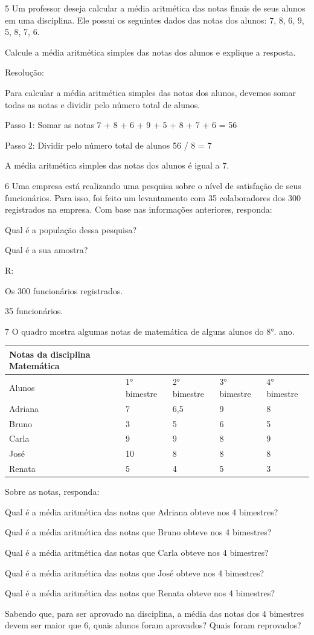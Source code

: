 {\num{5} Um professor deseja calcular a média aritmética das notas finais de
seus alunos em uma disciplina. Ele possui os seguintes dados das notas
dos alunos: 7, 8, 6, 9, 5, 8, 7, 6.

Calcule a média aritmética simples das notas dos alunos e explique a
resposta.

Resolução:

Para calcular a média aritmética simples das notas dos alunos, devemos
somar todas as notas e dividir pelo número total de alunos.

Passo 1: Somar as notas 7 + 8 + 6 + 9 + 5 + 8 + 7 + 6 = 56

Passo 2: Dividir pelo número total de alunos 56 / 8 = 7

A média aritmética simples das notas dos alunos é igual a 7.

\num{6} Uma empresa está realizando uma pesquisa sobre o nível de satisfação
de seus funcionários. Para isso, foi feito um levantamento com 35
colaboradores dos 300 registrados na empresa. Com base nas informações
anteriores, responda:
\item Qual é a população dessa pesquisa?
\item Qual é a sua amostra?

R:
\item Os 300 funcionários registrados.
\item 35 funcionários.

\num{7} O quadro mostra algumas notas de matemática de alguns alunos do 8°.
ano.


\begin{longtable}[]{@{}lllll@{}}
\toprule
Notas da disciplina Matemática & & & &\tabularnewline
\midrule
\endhead
Alunos & 1° bimestre & 2° bimestre & 3° bimestre & 4°
bimestre\tabularnewline
Adriana & 7 & 6,5 & 9 & 8\tabularnewline
Bruno & 3 & 5 & 6 & 5\tabularnewline
Carla & 9 & 9 & 8 & 9\tabularnewline
José & 10 & 8 & 8 & 8\tabularnewline
Renata & 5 & 4 & 5 & 3\tabularnewline
\bottomrule
\end{longtable}

Sobre as notas, responda:
\item Qual é a média aritmética das notas que Adriana obteve nos 4
bimestres?
\item Qual é a média aritmética das notas que Bruno obteve nos 4 bimestres?
\item Qual é a média aritmética das notas que Carla obteve nos 4 bimestres?
\item Qual é a média aritmética das notas que José obteve nos 4 bimestres?
\item Qual é a média aritmética das notas que Renata obteve nos 4
bimestres?
\item Sabendo que, para ser aprovado na disciplina, a média das notas dos 4
bimestres devem ser maior que 6, quais alunos foram aprovados? Quais
foram reprovados?

}
